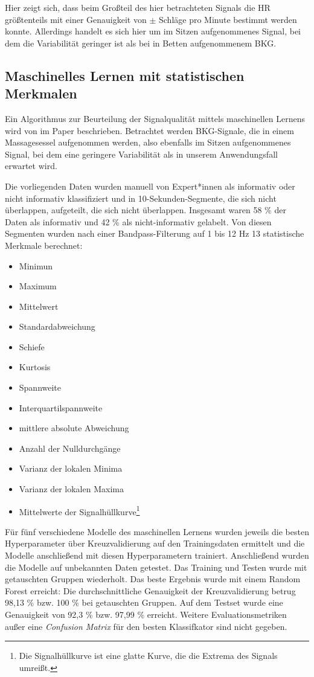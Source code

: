 	Hier zeigt sich, dass beim Großteil des hier betrachteten Signals die \ac{HR} größtenteils mit einer Genauigkeit von $\pm$ Schläge pro Minute bestimmt werden konnte. Allerdings handelt es sich hier um im Sitzen aufgenommenes Signal, bei dem die Variabilität geringer ist als bei in Betten aufgenommenem \ac{BKG}.
	
	
	\subsection{Maschinelles Lernen mit statistischen Merkmalen}
	
	Ein Algorithmus zur Beurteilung der Signalqualität mittels maschinellen Lernens wird von \citeauthor{Sadek2016} im Paper  beschrieben. Betrachtet werden \ac{BKG}-Signale, die in einem Massagesessel aufgenommen werden, also ebenfalls im Sitzen aufgenommenes Signal, bei dem eine geringere Variabilität als in unserem Anwendungsfall erwartet wird.
	
	Die vorliegenden Daten wurden manuell von Expert*innen als informativ oder nicht informativ klassifiziert und in 10-Sekunden-Segmente, die sich nicht überlappen, aufgeteilt, die sich nicht überlappen. Insgesamt waren 58 \% der Daten als informativ und 42 \% als nicht-informativ gelabelt. Von diesen Segmenten wurden nach einer Bandpass-Filterung auf 1 bis 12 Hz 13 statistische Merkmale berechnet:
	\begin{itemize}
		\item Minimun
		\item Maximum
		\item Mittelwert
		\item Standardabweichung
		\item Schiefe
		\item Kurtosis
		\item Spannweite
		\item Interquartilspannweite
		\item mittlere absolute Abweichung
		\item Anzahl der Nulldurchgänge
		\item Varianz der lokalen Minima
		\item Varianz der lokalen Maxima
		\item Mittelwerte der Signalhüllkurve\footnote{Die Signalhüllkurve ist eine glatte Kurve, die die Extrema des Signals umreißt.}
	\end{itemize}
	
	Für fünf verschiedene Modelle des maschinellen Lernens wurden jeweils die besten Hyperparameter über Kreuzvalidierung auf den Trainingsdaten ermittelt und die Modelle anschließend mit diesen Hyperparametern trainiert. Anschließend wurden die Modelle auf unbekannten Daten getestet. Das Training und Testen wurde mit getauschten Gruppen wiederholt. Das beste Ergebnis wurde mit einem Random Forest erreicht: Die durchschnittliche Genauigkeit der Kreuzvalidierung betrug 98,13 \% bzw. 100 \% bei getauschten Gruppen. Auf dem Testset wurde eine Genauigkeit von 92,3 \% bzw. 97,99 \% erreicht. Weitere Evaluationsmetriken außer eine \textit{Confusion Matrix} für den besten Klassifkator sind nicht gegeben.
	
